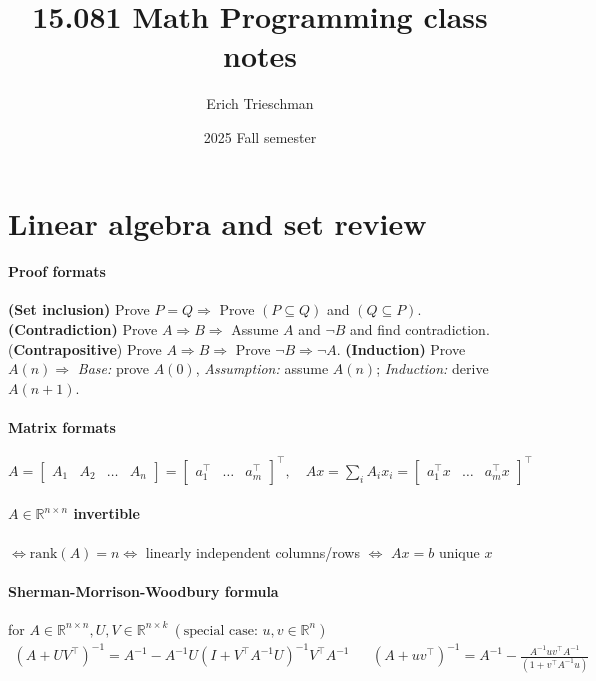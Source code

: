 \documentclass{article}
\title{15.081 Math Programming class notes}
\author{Erich Trieschman}
\date{2025 Fall semester}
\begin{document}
\maketitle
\tableofcontents

\section{Linear algebra and set review}
\paragraph{Proof formats} \textbf{(Set inclusion)} Prove $P = Q \Longrightarrow$ Prove $(P\subseteq Q)$ and $(Q\subseteq P)$. \textbf{(Contradiction)} Prove $A \Rightarrow B \Longrightarrow$ Assume $A$ and $\neg B$ and find contradiction. (\textbf{Contrapositive}) Prove $A \Rightarrow B \Longrightarrow$ Prove $\neg B\Rightarrow \neg A$. \textbf{(Induction)} Prove $A(n) \Longrightarrow$ \emph{Base:} prove $A(0)$, \emph{Assumption:} assume $A(n)$; \emph{Induction:} derive $A(n+1)$.

\paragraph{Matrix formats} $A = \begin{bmatrix}A_1 & A_2& \dots & A_n\end{bmatrix} = 
    \begin{bmatrix} a_1^\top  & \dots & a_m^\top \end{bmatrix}^\top ,\quad Ax = \sum_i A_ix_i = 
    \begin{bmatrix} a_1^\top x & \dots & a_m^\top x \end{bmatrix}^\top $

\paragraph{$A \in \mathbb R^{n\times n}$ invertible} $\iff \text{rank}(A) = n \iff$ linearly independent columns/rows $\iff$ $Ax=b$ unique $x$

\paragraph{Sherman-Morrison-Woodbury formula} 
for $A\in \mathbb{R}^{n\times n}, U,V \in \mathbb{R}^{n\times k}\ (\text{special case: } u,v \in \mathbb R^n)$
\begin{align*}
    (A+UV^\top)^{-1} = A^{-1} - A^{-1}U(I+V^\top A^{-1}U)^{-1}V^\top A^{-1}
    && (A+uv^\top)^{-1} = A^{-1} - \frac{A^{-1}uv^\top A^{-1}}{(1+v^\top A^{-1}u)}
\end{align*}
\end{document}
